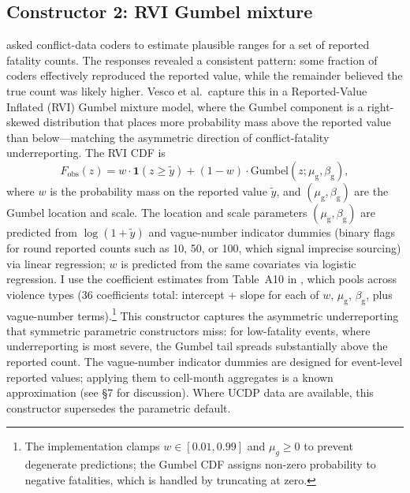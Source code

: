 \subsection*{Constructor 2: RVI Gumbel mixture}
\citet{vesco2026uncertainty} asked conflict-data coders to estimate plausible ranges for a set of reported fatality counts. The responses revealed a consistent pattern: some fraction of coders effectively reproduced the reported value, while the remainder believed the true count was likely higher. Vesco et al.\ capture this in a Reported-Value Inflated (RVI) Gumbel mixture model, where the Gumbel component is a right-skewed distribution that places more probability mass above the reported value than below---matching the asymmetric direction of conflict-fatality underreporting. The RVI CDF is
%
\begin{equation}
    F_\text{obs}(z) = w \cdot \mathbf{1}(z \geq \tilde{y}) + (1 - w) \cdot \text{Gumbel}(z; \mu_\text{g}, \beta_\text{g}),
\end{equation}
%
where $w$ is the probability mass on the reported value $\tilde{y}$, and $(\mu_\text{g}, \beta_\text{g})$ are the Gumbel location and scale. The location and scale parameters $(\mu_\text{g}, \beta_\text{g})$ are predicted from $\log(1 + \tilde{y})$ and vague-number indicator dummies (binary flags for round reported counts such as 10, 50, or 100, which signal imprecise sourcing) via linear regression; $w$ is predicted from the same covariates via logistic regression. I use the coefficient estimates from Table~A10 in \citet{vesco2026uncertainty}, which pools across violence types (36 coefficients total: intercept + slope for each of $w$, $\mu_\text{g}$, $\beta_\text{g}$, plus vague-number terms).\footnote{The implementation clamps $w \in [0.01, 0.99]$ and $\mu_g \geq 0$ to prevent degenerate predictions; the Gumbel CDF assigns non-zero probability to negative fatalities, which is handled by truncating at zero.} This constructor captures the asymmetric underreporting that symmetric parametric constructors miss: for low-fatality events, where underreporting is most severe, the Gumbel tail spreads substantially above the reported count. The vague-number indicator dummies are designed for event-level reported values; applying them to cell-month aggregates is a known approximation (see \S7 for discussion). Where UCDP data are available, this constructor supersedes the parametric default.

